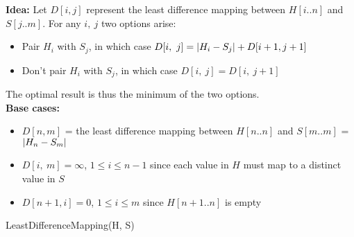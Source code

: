 \documentclass[12pt]{article}
\newenvironment{question}[2][Question]{\begin{trivlist}
\item[\hskip \labelsep {\bfseries #1}\hskip \labelsep {\bfseries #2.}]}{\end{trivlist}}
\DeclarePairedDelimiter\abs{\lvert}{\rvert}%
\begin{document}
\begin{question}{2 (b)}
  \leavevmode \\ \\
  \textbf{Idea:} Let $D[i, j]$ represent the least difference mapping between
  $H[i..n]$ and $S[j..m]$.  For any $i,\ j$ two options arise:
  \begin{itemize}
    \item Pair $H_{i}$ with $S_{j}$, in which case $D[i,\ j] = \abs{H_{i} - S_{j}} + D[i + 1, j + 1]$
    \item Don't pair $H_{i}$ with $S_{j}$, in which case $D[i,\ j] = D[i,\ j + 1]$
  \end{itemize}
  The optimal result is thus the minimum of the two options. \\

  \textbf{Base cases:}
  \begin{itemize}
    \item $D[n, m]$ = the least difference mapping between $H[n..n]$ and $S[m..m]$ = $\abs{H_{n} - S_{m}}$
    \item $D[i,\ m] = \infty$, $1 \leq i \leq n - 1$ since each value in $H$ must map to a distinct value in $S$
    \item $D[n + 1, i] = 0$, $1 \leq i \leq m$ since $H[n+1..n]$ is empty
  \end{itemize}

  \begin{algorithm}[H]
    \caption{LeastDifferenceMapping(H, S)}
    \BlankLine

  \end{algorithm}


\end{question}
\end{document}

